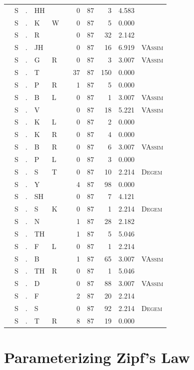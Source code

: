 \documentclass[12pt]{article}
\begin{document}
\begin{longtable}{r@{ } r@{ } c@{ } l@{ } l@{ } l@{ } r r r r l }
 & S & . & HH &  &  & 0 & 87 & 3 & 4.583 &  \\
 & S & . & K & W &  & 0 & 87 & 5 & 0.000 &  \\
 & S & . & R &  &  & 0 & 87 & 32 & 2.142 &  \\
 & S & . & JH &  &  & 0 & 87 & 16 & 6.919 & \textsc{VAssim} \\
 & S & . & G & R &  & 0 & 87 & 3 & 3.007 & \textsc{VAssim} \\
 & S & . & T &  &  & 37 & 87 & 150 & 0.000 &  \\
 & S & . & P & R &  & 1 & 87 & 5 & 0.000 &  \\
 & S & . & B & L &  & 0 & 87 & 1 & 3.007 & \textsc{VAssim} \\
 & S & . & V &  &  & 0 & 87 & 18 & 5.221 & \textsc{VAssim} \\
 & S & . & K & L &  & 0 & 87 & 2 & 0.000 &  \\
 & S & . & K & R &  & 0 & 87 & 4 & 0.000 &  \\
 & S & . & B & R &  & 0 & 87 & 6 & 3.007 & \textsc{VAssim} \\
 & S & . & P & L &  & 0 & 87 & 3 & 0.000 &  \\
 & S & . & S & T &  & 0 & 87 & 10 & 2.214 & \textsc{Degem} \\
 & S & . & Y &  &  & 4 & 87 & 98 & 0.000 &  \\
 & S & . & SH &  &  & 0 & 87 & 7 & 4.121 &  \\
 & S & . & S & K &  & 0 & 87 & 1 & 2.214 & \textsc{Degem} \\
 & S & . & N &  &  & 1 & 87 & 28 & 2.182 &  \\
 & S & . & TH &  &  & 1 & 87 & 5 & 5.046 &  \\
 & S & . & F & L &  & 0 & 87 & 1 & 2.214 &  \\
 & S & . & B &  &  & 1 & 87 & 65 & 3.007 & \textsc{VAssim} \\
 & S & . & TH & R &  & 0 & 87 & 1 & 5.046 &  \\
 & S & . & D &  &  & 0 & 87 & 88 & 3.007 & \textsc{VAssim} \\
 & S & . & F &  &  & 2 & 87 & 20 & 2.214 &  \\
 & S & . & S &  &  & 0 & 87 & 92 & 2.214 & \textsc{Degem} \\
 & S & . & T & R &  & 8 & 87 & 19 & 0.000 &  \\
\bottomrule
\end{longtable}

\section{Parameterizing Zipf's Law}
\label{zr}
\end{document}
